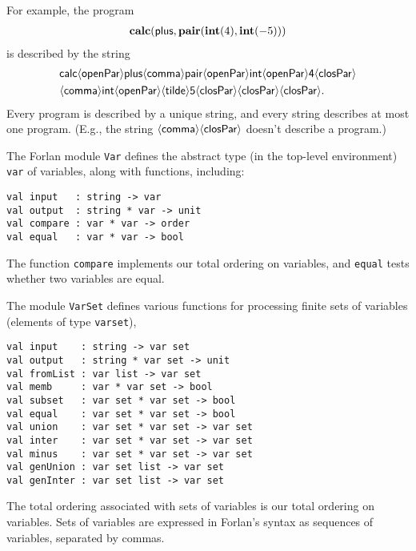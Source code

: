 For example, the program
\begin{gather*}
\mathbf{calc}(\mathsf{plus},\mathbf{pair}(\mathbf{int}(4),\mathbf{int}(-5)))
\end{gather*}
is described by the string
\begin{gather*}
\mathsf{calc\openparsym plus\commasym pair\openparsym int
\openparsym 4\closparsym} \\
\hspace{-1cm}
\mathsf{\commasym int\openparsym\mytildesym 5\closparsym\closparsym\closparsym} .
\end{gather*}
Every program is described by a unique string, and every
string describes at most one program.  (E.g., the string
$\mathsf{{\langle\mathsf{comma}\rangle}{\langle\mathsf{closPar}\rangle}}$ doesn't describe a program.)

The Forlan module \texttt{Var} defines the abstract type (in the top-level
%
%
environment) \texttt{var} of variables, along with functions, including:
\begin{verbatim}
val input   : string -> var
val output  : string * var -> unit
val compare : var * var -> order
val equal   : var * var -> bool
\end{verbatim}
%
%
%
%
The function \texttt{compare} implements our total ordering on
variables, and \texttt{equal} tests whether two
variables are equal.

The module \texttt{VarSet}
%
defines various functions for processing
finite sets of variables (elements of type \texttt{var\;set}),
%
\begin{verbatim}
val input    : string -> var set
val output   : string * var set -> unit
val fromList : var list -> var set
val memb     : var * var set -> bool
val subset   : var set * var set -> bool
val equal    : var set * var set -> bool
val union    : var set * var set -> var set
val inter    : var set * var set -> var set
val minus    : var set * var set -> var set
val genUnion : var set list -> var set
val genInter : var set list -> var set
\end{verbatim}
%
%
%
%
%
%
%
%
%
%
%
The total ordering associated with sets of variables is our total
ordering on variables.  Sets of variables are expressed in Forlan's syntax
as sequences of variables, separated by commas.

